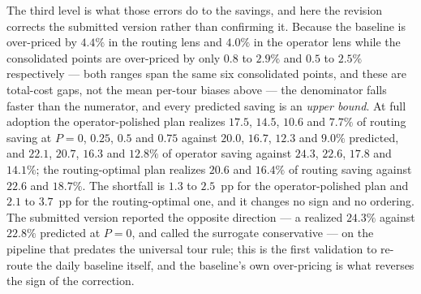 \documentclass[preprint,12pt,authoryear]{elsarticle}
\begin{document}
The third level is what those errors do to the savings, and here the revision corrects the submitted version rather than confirming it. Because the baseline is over-priced by $4.4\%$ in the routing lens and $4.0\%$ in the operator lens while the consolidated points are over-priced by only $0.8$ to $2.9\%$ and $0.5$ to $2.5\%$ respectively --- both ranges span the same six consolidated points, and these are total-cost gaps, not the mean per-tour biases above --- the denominator falls faster than the numerator, and every predicted saving is an \emph{upper bound}. At full adoption the operator-polished plan realizes $17.5$, $14.5$, $10.6$ and $7.7\%$ of routing saving at $P = 0$, $0.25$, $0.5$ and $0.75$ against $20.0$, $16.7$, $12.3$ and $9.0\%$ predicted, and $22.1$, $20.7$, $16.3$ and $12.8\%$ of operator saving against $24.3$, $22.6$, $17.8$ and $14.1\%$; the routing-optimal plan realizes $20.6$ and $16.4\%$ of routing saving against $22.6$ and $18.7\%$. The shortfall is $1.3$ to $2.5$~pp for the operator-polished plan and $2.1$ to $3.7$~pp for the routing-optimal one, and it changes no sign and no ordering. The submitted version reported the opposite direction --- a realized $24.3\%$ against $22.8\%$ predicted at $P = 0$, and called the surrogate conservative --- on the pipeline that predates the universal tour rule; this is the first validation to re-route the daily baseline itself, and the baseline's own over-pricing is what reverses the sign of the correction.
\end{document}
